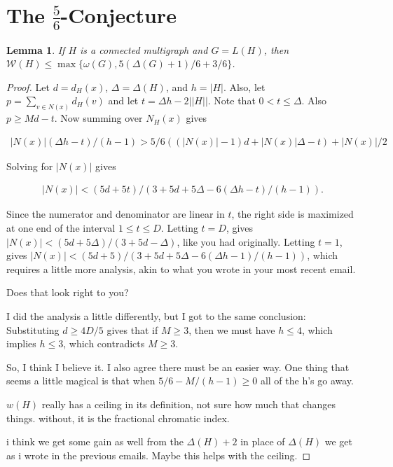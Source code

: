\documentclass[12pt]{amsart}
\theoremstyle{plain}
\newtheorem{lem}[thm]{Lemma}
\theoremstyle{definition}
\theoremstyle{remark}
\newcommand{\fancy}[1]{\mathcal{#1}}
\newcommand{\W}{\fancy{W}}
\begin{document}
\section{The $\frac56$-Conjecture}
\begin{lem}
If $H$ is a connected multigraph and $G = L(H)$, then $\W(H) \le
\max\{\omega(G), 5(\Delta(G) + 1) / 6 + 3/6\}$.
\end{lem}
\begin{proof}
Let $d = d_H(x)$,  $\Delta = \Delta(H)$, and $h = |H|$. 
Also, let $p = \sum_{v \in N(x)} d_H(v)$ and
let $t = \Delta h-2||H||$.
Note that $0 < t \le \Delta$.  Also $p \ge Md - t$.  Now summing over $N_H(x)$
gives

\begin{align*}
|N(x)|(\Delta h-t)/(h-1) > 5/6((|N(x)|-1)d + |N(x)|\Delta - t) + |N(x)|/2
\end{align*}

Solving for $|N(x)|$ gives

\begin{align*}
|N(x)| < (5d+5t)/(3+5d+5\Delta-6(\Delta h-t)/(h-1)).
\end{align*}

Since the numerator and denominator are linear in $t$, the right side is
maximized at one end of the interval $1 \le t \le D$.  Letting $t = D$,
gives $|N(x)| < (5d+5\Delta)/(3+5d-\Delta)$, like you had originally.  Letting $t = 1$,
gives $|N(x)| < (5d+5)/(3+5d+5\Delta-6(\Delta h-1)/(h-1))$, which requires a little more
analysis, akin to what you wrote in your most recent email.

Does that look right to you?



I did the analysis a little differently, but I got to the same
conclusion: Substituting $d \ge 4D/5$ gives that if $M \ge 3$, then we
must have $h \le 4$, which implies $h \le 3$, which contradicts $M \ge 3$.

So, I think I believe it.  I also agree there must be an easier way.
One thing that seems a little magical is that when $5/6 - M/(h-1) \ge 0$
all of the h's go away.

$w(H)$ really has a ceiling in its definition, not sure how much that changes
things.   without, it is the fractional chromatic index.

i think we get some gain as well from the $\Delta(H) + 2$ in place of $\Delta(H)$
we get as i wrote in the previous emails.   Maybe this helps with the ceiling.


\end{proof}
\end{document}
